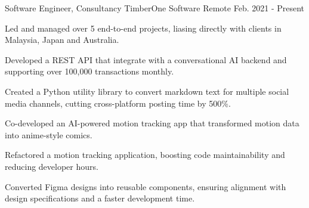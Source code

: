 

\begin{cventries}

  \cventry
    {Software Engineer, Consultancy} %
    {TimberOne Software} %
    {Remote} %
    {Feb. 2021 - Present} %
    {
      \begin{cvitems} %
        \item {Led and managed over 5 end-to-end projects, liasing directly with clients in Malaysia, Japan and Australia.}
        \item {Developed a REST API that integrate with a conversational AI backend and supporting over 100,000 transactions monthly.}
        \item {Created a Python utility library to convert markdown text for multiple social media channels, cutting cross-platform posting time by 500\%.}
        \item {Co-developed an AI-powered motion tracking app that transformed motion data into anime-style comics.}
        \item {Refactored a motion tracking application, boosting code maintainability and reducing developer hours.}
        \item {Converted Figma designs into reusable components, ensuring alignment with design specifications and a faster development time.}
      \end{cvitems}
    }


\end{cventries}
